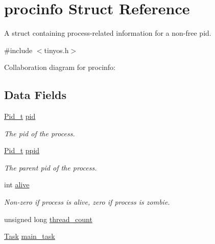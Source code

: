 \hypertarget{structprocinfo}{}\section{procinfo Struct Reference}
\label{structprocinfo}


A struct containing process-\/related information for a non-\/free pid.  




{\ttfamily \#include $<$tinyos.\+h$>$}



Collaboration diagram for procinfo\+:
\subsection*{Data Fields}
\begin{DoxyCompactItemize}
\item 
\hyperlink{group__syscalls_gafac07f3170763932fac97b6eab2c3984}{Pid\+\_\+t} \hyperlink{structprocinfo_a2e87cd5f0bdfe214832ec20f53deeb50}{pid}\hypertarget{structprocinfo_a2e87cd5f0bdfe214832ec20f53deeb50}{}\label{structprocinfo_a2e87cd5f0bdfe214832ec20f53deeb50}

\begin{DoxyCompactList}\small\item\em The pid of the process. \end{DoxyCompactList}\item 
\hyperlink{group__syscalls_gafac07f3170763932fac97b6eab2c3984}{Pid\+\_\+t} \hyperlink{structprocinfo_a790970c70987013b2712b7dd6d2b75b9}{ppid}
\begin{DoxyCompactList}\small\item\em The parent pid of the process. \end{DoxyCompactList}\item 
int \hyperlink{structprocinfo_a999dc5dbfee9902a9ea458944499efd3}{alive}\hypertarget{structprocinfo_a999dc5dbfee9902a9ea458944499efd3}{}\label{structprocinfo_a999dc5dbfee9902a9ea458944499efd3}

\begin{DoxyCompactList}\small\item\em Non-\/zero if process is alive, zero if process is zombie. \end{DoxyCompactList}\item 
unsigned long \hyperlink{structprocinfo_ae1ed3afa8904729a1daf1b51780cf2cf}{thread\+\_\+count}
\item 
\hyperlink{group__syscalls_gaec3f2f835e105271fbbc00272c0ba984}{Task} \hyperlink{structprocinfo_a4da339065f8780b37ab788f18ef9ed20}{main\+\_\+task}\hypertarget{structprocinfo_a4da339065f8780b37ab788f18ef9ed20}{}\label{structprocinfo_a4da339065f8780b37ab788f18ef9ed20}


\end{DoxyCompactItemize}
